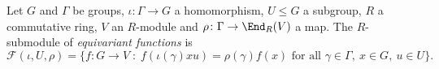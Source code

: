 Let $G$ and $\Gamma$ be groups, $\iota\colon\Gamma\to G$ a homomorphism, $U\le G$ a subgroup, $R$ a commutative ring, $V$ an $R$-module and
$\rho\colon\Gamma\to\End_R(V)$ a map. The $R$-submodule of \emph{equivariant functions} is
\[
  \mathcal F(\iota,U,\rho)=\{f\colon G\to V\;:\;f(\iota(\gamma)xu)=\rho(\gamma)f(x)\text{ for all }\gamma\in\Gamma,\ x\in G,\ u\in U\}.
\]
